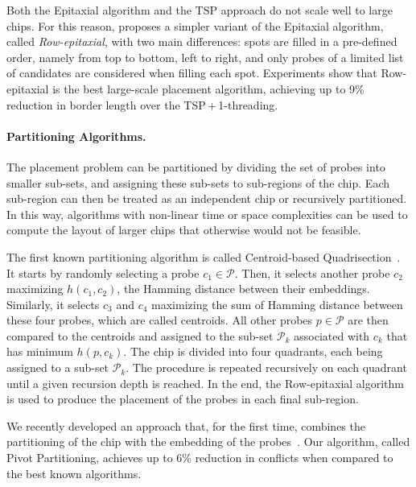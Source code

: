 \documentclass[english]{lni}
\newcommand{\ignore}[1]{}
\begin{document}
Both the Epitaxial algorithm and the TSP approach do not scale well to large
chips. For this reason, \cite{KAHNG03A} proposes a simpler variant of the
Epitaxial algorithm, called \emph{Row-epitaxial}, with two main differences:
spots are filled in a pre-defined order, namely from top to bottom, left to
right, and only probes of a limited list of candidates are considered when
filling each spot. Experiments show that Row-epitaxial is the best
large-scale placement algorithm, achieving up to 9\% reduction in border
length over the TSP\,+\,1-threading.

\paragraph{Partitioning Algorithms.}
The placement problem can be partitioned by dividing the set of probes into
smaller sub-sets, and assigning these sub-sets to sub-regions of the chip.
Each sub-region can then be treated as an independent chip or recursively
partitioned. 
In this way, algorithms with non-linear time or space
complexities can be used to compute the layout of larger chips that otherwise
would not be feasible.

The first known partitioning algorithm is called Centroid-based
Quadrisection~\cite{KAHNG03B}. It starts by randomly selecting a probe
$c_1 \in \mathcal{P}$. Then, it selects another probe $c_2$ maximizing
$h(c_1,c_2)$, the Hamming distance between their embeddings. Similarly, it
selects $c_3$ and $c_4$ maximizing the sum of Hamming distance between these
four probes, which are called centroids. All other probes $p \in \mathcal{P}$
are then compared to the centroids and assigned to the sub-set $\mathcal{P}_k$
associated with $c_k$ that has minimum $h(p,c_k)$. The chip is divided into four
quadrants, each being assigned to a sub-set $\mathcal{P}_k$.  The procedure
is repeated recursively on each quadrant until a given recursion depth is
reached. In the end, the Row-epitaxial algorithm is used to produce the
placement of the probes in each final sub-region.

We recently developed an approach that, for the first
time, combines the partitioning of the chip with the embedding of the
probes~\cite{CARVALHO06}. Our algorithm, called Pivot Partitioning, achieves
up to 6\% reduction in conflicts when compared to the best known algorithms.

\ignore{
Their results show that the running time of the row-epitaxial algorithm
drops significantly with increasing recursion depth. The time required to place
the probes of a 500\,x\,500 chip, for instance, dropped by 69\% with $L = 3$
when compared with the time required by the row-epitaxial without any
partitioning.
It is not clear from their experiments, however, how the choice of $L$ impaired
the performance of the row-epitaxial algorithm in terms of solution quality
since they have restricted their experiments to $L \leq 3$. Moreover, there is
no clear trend toward reduction or increase in border length as $L$ varies
from~0 to~3.
}
\end{document}
